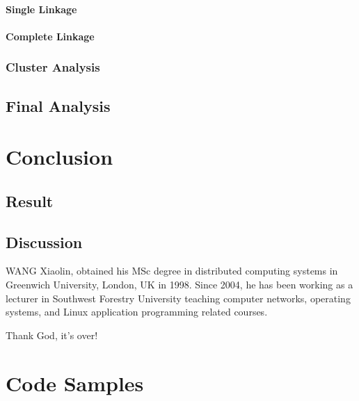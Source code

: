 \documentclass{swfuthesise}
\begin{document}
\subsubsection{Single Linkage}
\lipsum[42]

\subsubsection{Complete Linkage}
\lipsum[43]

\subsection{Cluster Analysis}
\lipsum[44]

\section{Final Analysis}
\lipsum[45]

\chapter{Conclusion}
\lipsum[46]

\section{Result}
\lipsum[47]

\section{Discussion}
\lipsum[48]

\appendix%

\makebib %

\begin{advisorInfo} 
  WANG Xiaolin, obtained his MSc degree in distributed computing systems in Greenwich
  University, London, UK in 1998. Since 2004, he has been working as a lecturer in Southwest
  Forestry University teaching computer networks, operating systems, and Linux application
  programming related courses.  
\end{advisorInfo}

\begin{acknowledgment}
  Thank God, it's over!
\end{acknowledgment}

\singlespacing

\chapter{Code Samples}
\end{document}
